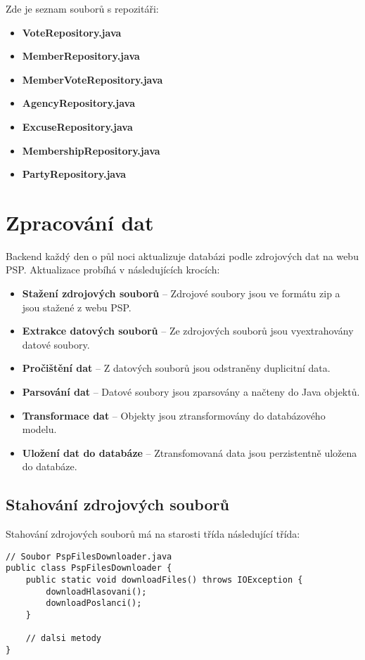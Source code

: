 \noindent Zde je seznam souborů s repozitáři:

\begin{itemize}
	\item \textbf{VoteRepository.java}
	\item \textbf{MemberRepository.java}
	\item \textbf{MemberVoteRepository.java}
	\item \textbf{AgencyRepository.java}
	\item \textbf{ExcuseRepository.java}
	\item \textbf{MembershipRepository.java}
	\item \textbf{PartyRepository.java}
\end{itemize}

\section{Zpracování dat}
Backend každý den o půl noci aktualizuje databázi podle zdrojových dat na webu PSP. Aktualizace probíhá v následujících krocích:

\begin{itemize}
	\item \textbf{Stažení zdrojových souborů} -- Zdrojové soubory jsou ve formátu zip a jsou stažené z webu PSP.
	\item \textbf{Extrakce datových souborů} -- Ze zdrojových souborů jsou vyextrahovány datové soubory.
	\item \textbf{Pročištění dat} -- Z datových souborů jsou odstraněny duplicitní data.
	\item \textbf{Parsování dat} -- Datové soubory jsou zparsovány a načteny do Java objektů.
	\item \textbf{Transformace dat} --  Objekty jsou ztransformovány do databázového modelu.
	\item \textbf{Uložení dat do databáze} -- Ztransfomovaná data jsou perzistentně uložena do databáze.
\end{itemize}

\subsection{Stahování zdrojových souborů}
Stahování zdrojových souborů má na starosti třída následující třída:

\begin{lstlisting}[caption={Třída pro stahování zdrojových souborů}, label={lst:psp-downloader}, tabsize=2]
// Soubor PspFilesDownloader.java
public class PspFilesDownloader {
	public static void downloadFiles() throws IOException {
		downloadHlasovani();
		downloadPoslanci();
	}

	// dalsi metody
}
\end{lstlisting}

